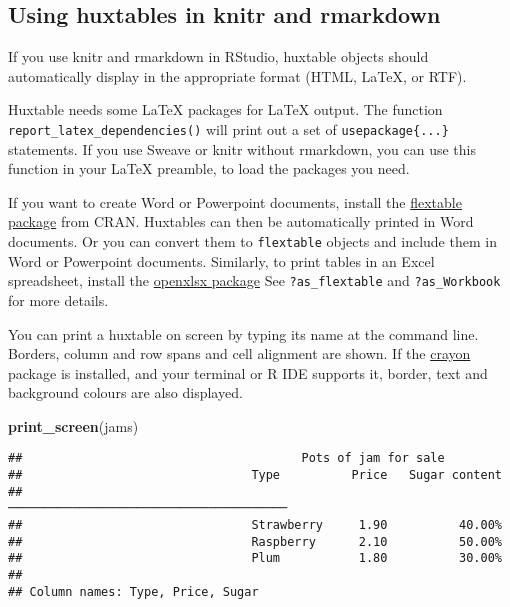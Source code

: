 \documentclass[]{article}
\newenvironment{Shaded}{\begin{snugshade}}{\end{snugshade}}
\newcommand{\KeywordTok}[1]{\textcolor[rgb]{0.13,0.29,0.53}{\textbf{#1}}}
\newcommand{\NormalTok}[1]{#1}
\begin{document}
\FloatBarrier

\hypertarget{using-huxtables-in-knitr-and-rmarkdown}{%
\subsection{Using huxtables in knitr and
rmarkdown}\label{using-huxtables-in-knitr-and-rmarkdown}}

If you use knitr and rmarkdown in RStudio, huxtable objects should
automatically display in the appropriate format (HTML, LaTeX, or RTF).

Huxtable needs some LaTeX packages for LaTeX output. The function
\texttt{report\_latex\_dependencies()} will print out a set of
\texttt{usepackage\{...\}} statements. If you use Sweave or knitr
without rmarkdown, you can use this function in your LaTeX preamble, to
load the packages you need.

If you want to create Word or Powerpoint documents, install the
\href{https://cran.r-project.org/package=flextable}{flextable package}
from CRAN. Huxtables can then be automatically printed in Word
documents. Or you can convert them to \texttt{flextable} objects and
include them in Word or Powerpoint documents. Similarly, to print tables
in an Excel spreadsheet, install the
\href{https://cran.r-project.org/package=openxlsx}{openxlsx package} See
\texttt{?as\_flextable} and \texttt{?as\_Workbook} for more details.

You can print a huxtable on screen by typing its name at the command
line. Borders, column and row spans and cell alignment are shown. If the
\href{https://cran.r-project.org/package=crayon}{crayon} package is
installed, and your terminal or R IDE supports it, border, text and
background colours are also displayed.

\begin{Shaded}
\begin{Highlighting}[]
\KeywordTok{print_screen}\NormalTok{(jams)}
\end{Highlighting}
\end{Shaded}

\begin{verbatim}
##                                       Pots of jam for sale                                        
##                                Type          Price   Sugar content  
##                              ───────────────────────────────────────
##                                Strawberry     1.90          40.00%  
##                                Raspberry      2.10          50.00%  
##                                Plum           1.80          30.00%  
## 
## Column names: Type, Price, Sugar
\end{verbatim}
\end{document}
